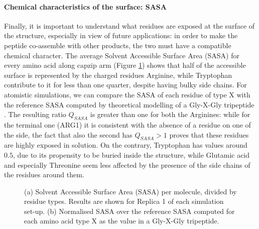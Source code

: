\paragraph{Chemical characteristics of the surface: SASA} Finally, it is important to understand what residues are exposed at the surface of the structure, especially in view of future applications: in order to make the peptide co-assemble with other products, the two must have a compatible chemical character. The average Solvent Accessible Surface Area (SASA) for every amino acid along capzip arm (Figure \ref{fig:BTI_sasa_exposed}) shows that half of the accessible surface is represented by the charged residues Arginine, while Tryptophan contribute to it for less than one quarter, despite having bulky side chains.
%
For atomistic simulations, we can compare the SASA of each residue of type X with the reference SASA computed by theoretical modelling of a Gly-X-Gly tripeptide \citep{Tien2013}. The resulting ratio $Q_{SASA}$ is greater than one for both the Arginines: while for the terminal one (ARG1) it is consistent with the absence of a residue on one of the side, the fact that also the second has $Q_{SASA}>1$ proves that these residues are highly exposed in solution. On the contrary, Tryptophan has values around $0.5$, due to its propensity to be buried inside the structure, while Glutamic acid and especially Threonine seem less affected by the presence of the side chains of the residues around them.
\begin{figure}[t]
\centering
{} 
\caption[SASA per residue of a buckyball in solution]{(a) Solvent Accessible Surface Area (SASA) per molecule, divided by residue types. Results are shown for Replica 1 of each simulation set-up. (b) Normalised SASA over the reference SASA computed for each amino acid type X as the value in a Gly-X-Gly tripeptide.}
\label{fig:BTI_sasa_exposed}
\end{figure}

